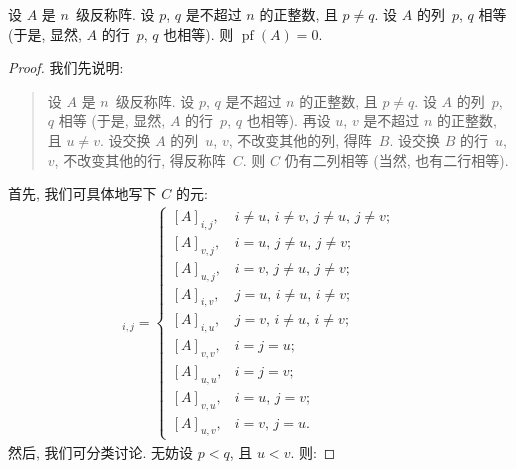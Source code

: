 \begin{theorem}
    设 \(A\) 是 \(n\)~级反称阵.
    设 \(p\), \(q\) 是不超过 \(n\) 的正整数, 且 \(p \neq q\).
    设 \(A\) 的列~\(p\), \(q\) 相等
    (于是, 显然, \(A\) 的行~\(p\), \(q\) 也相等).
    则 \(\operatorname{pf} {(A)} = 0\).
\end{theorem}

\begin{proof}
    我们先说明:
    \begin{quotation}
        设 \(A\) 是 \(n\)~级反称阵.
        设 \(p\), \(q\) 是不超过 \(n\) 的正整数, 且 \(p \neq q\).
        设 \(A\) 的列~\(p\), \(q\) 相等
        (于是, 显然, \(A\) 的行~\(p\), \(q\) 也相等).
        再设 \(u\), \(v\) 是不超过 \(n\) 的正整数, 且 \(u \neq v\).
        设交换 \(A\) 的列~\(u\), \(v\), 不改变其他的列, 得阵~\(B\).
        设交换 \(B\) 的行~\(u\), \(v\), 不改变其他的行,
        得反称阵~\(C\).
        则 \(C\) 仍有二列相等 (当然, 也有二行相等).
    \end{quotation}

    首先, 我们可具体地写下 \(C\) 的元:
    \begin{align*}
        [C]_{i,j} =
        \begin{cases}
            [A]_{i,j},
             &
            \text{\(i \neq u\), \(i \neq v\), \(j \neq u\), \(j \neq v\)};
            \\
            [A]_{v,j},
             &
            \text{\(i = u\), \(j \neq u\), \(j \neq v\)};
            \\
            [A]_{u,j},
             &
            \text{\(i = v\), \(j \neq u\), \(j \neq v\)};
            \\
            [A]_{i,v},
             &
            \text{\(j = u\), \(i \neq u\), \(i \neq v\)};
            \\
            [A]_{i,u},
             &
            \text{\(j = v\), \(i \neq u\), \(i \neq v\)};
            \\
            [A]_{v,v},
             &
            \text{\(i = j = u\)};
            \\
            [A]_{u,u},
             &
            \text{\(i = j = v\)};
            \\
            [A]_{v,u},
             &
            \text{\(i = u\), \(j = v\)};
            \\
            [A]_{u,v},
             &
            \text{\(i = v\), \(j = u\)}.
        \end{cases}
    \end{align*}
    然后, 我们可分类讨论.
    无妨设 \(p < q\), 且 \(u < v\).
    则:


\end{proof}
